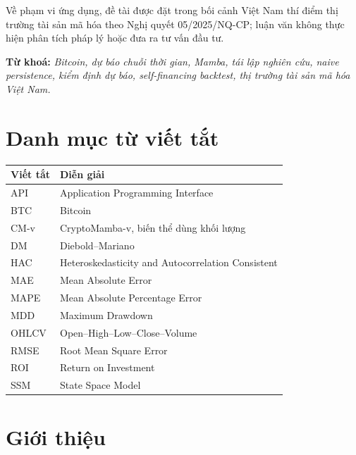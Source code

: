 \documentclass[13pt,a4paper,oneside]{report}
\begin{document}
Về phạm vi ứng dụng, đề tài được đặt trong bối cảnh Việt Nam thí điểm thị trường tài sản mã hóa theo
Nghị quyết 05/2025/NQ-CP; luận văn không thực hiện phân tích pháp lý hoặc đưa ra tư vấn đầu tư.

\vspace{6pt}
\noindent\textbf{Từ khoá:} \textit{Bitcoin, dự báo chuỗi thời gian, Mamba, tái lập nghiên cứu,
naive persistence, kiểm định dự báo, self-financing backtest, thị trường tài sản mã hóa Việt Nam.}

\tableofcontents
\listoffigures
{}
\listoftables
{}

\chapter*{Danh mục từ viết tắt}
\renewcommand{\arraystretch}{1.22}
\begin{tabularx}{\linewidth}{@{}lX@{}}
\toprule
\textbf{Viết tắt} & \textbf{Diễn giải} \\
\midrule
API & Application Programming Interface \\
BTC & Bitcoin \\
CM-v & CryptoMamba-v, biến thể dùng khối lượng \\
DM & Diebold--Mariano \\
HAC & Heteroskedasticity and Autocorrelation Consistent \\
MAE & Mean Absolute Error \\
MAPE & Mean Absolute Percentage Error \\
MDD & Maximum Drawdown \\
OHLCV & Open--High--Low--Close--Volume \\
RMSE & Root Mean Square Error \\
ROI & Return on Investment \\
SSM & State Space Model \\
\bottomrule
\end{tabularx}
\renewcommand{\arraystretch}{1.0}

\cleardoublepage
{}

\chapter{Giới thiệu}\label{chap:intro}
\end{document}
